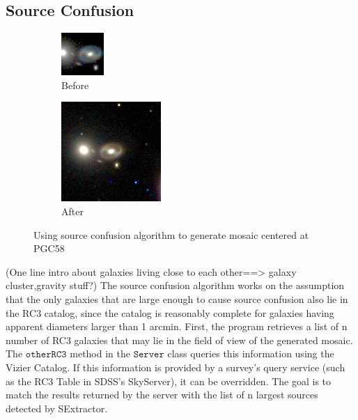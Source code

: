 \documentclass[5p]{elsarticle}
\begin{document}
	\subsection{Source Confusion}
%
%
%
\begin{figure}
\begin{subfigure}{.3\textwidth}
\centering
  \includegraphics[width=.4\linewidth]{figures/PGC58b4SC}
  \caption{Before}
\end{subfigure}%
\begin{subfigure}{.3\textwidth}
\centering
  \includegraphics[width=.4\linewidth]{figures/PGC58afterSC}
  \caption{After}
\end{subfigure}
\caption{Using source confusion algorithm to generate mosaic centered at PGC58}
\label{fig:SCdemo}
\end{figure}
	(One line intro about galaxies living close to each other==> galaxy cluster,gravity stuff?)
\indent The source confusion algorithm works on the assumption that the only galaxies that are large enough to cause source confusion also lie in the RC3 catalog, since the catalog is reasonably complete for galaxies having apparent diameters larger than 1 arcmin. First, the program retrieves a list of n number of RC3 galaxies that may lie in the field of view of the generated mosaic. The $\texttt{otherRC3}$ method in the $\texttt{Server}$ class queries this information using the Vizier Catalog. If this information is provided by a survey's query service (such as the RC3 Table in SDSS's SkyServer), it can be overridden. The goal is to match the results returned by the server with the list of n largest sources detected by SExtractor. 
\end{document}
